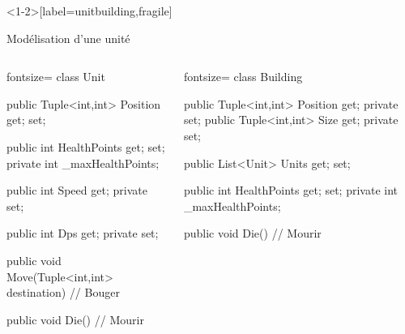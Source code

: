 \documentclass[12pt]{beamer}
\begin{document}
\begin{frame}<1-2>[label=unitbuilding,fragile]
\pause
\begin{center}{\large Modélisation d'une unité }\end{center}
    \begin{columns}[c]
        \column{2.3in}
        \begin{csharpcode*}{fontsize=\tiny}
class Unit
{
    public Tuple<int,int> Position { get; set; }

    public int HealthPoints { get; set; }
    private int _maxHealthPoints;

    public int Speed { get; private set; }

    public int Dps { get; private set; }

    public void Move(Tuple<int,int> destination)
    {
        // Bouger
    }

    public void Die()
    {
        // Mourir
    }
}
        \end{csharpcode*}
        \pause
        \column{2.5in}
        \begin{csharpcode*}{fontsize=\tiny}
class Building
{
    public Tuple<int,int> Position { get; private set; }
    public Tuple<int,int> Size { get; private set; }

    public List<Unit> Units { get; set; }

    public int HealthPoints { get; set; }
    private int _maxHealthPoints;

    public void Die()
    {
        // Mourir
    }
}
        \end{csharpcode*}
    \end{columns}
\end{frame}
\end{document}
